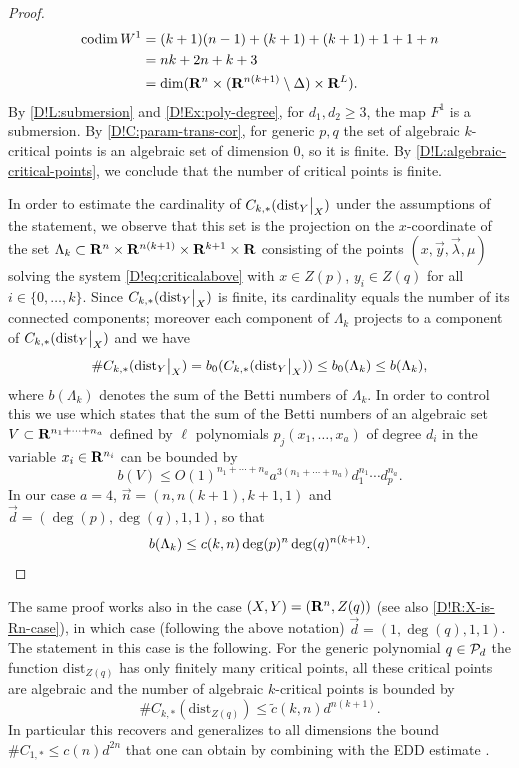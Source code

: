 \begin{proof}
  \begin{align*}
    \operatorname{codim} W^1 & = (k + 1) (n - 1) + (k + 1) + (k + 1) + 1 + 1 + n \\
    & = nk + 2n + k + 3 \\
    & = \dim(\mathbf{R}^n \times (\mathbf{R}^{n(k + 1)} \setminus \Delta) \times \mathbf{R}^L).
  \end{align*}
  By \cref{D!L:submersion} and \cref{D!Ex:poly-degree}, for $d_1, d_2 \geq 3$, the map $F^1$ is a submersion. By \cref{D!C:param-trans-cor}, for generic $p, q$ the set of algebraic $k$-critical points is an algebraic set of dimension $0$, so it is finite. By \cref{D!L:algebraic-critical-points}, we conclude that the number of critical points is finite.

  In order to estimate the cardinality of $C_{k, *}(\mathord{\operatorname{dist}}_Y\big|_X)$ under the assumptions of the statement, we observe that  this set is the projection on the $x$-coordinate of the set $\Lambda_k \subset \mathbf{R}^n\times \mathbf{R}^{n(k+1)}\times \mathbf{R}^{k+1}\times \mathbf{R}$ consisting of the points $(x, \vec{y}, \vec{\lambda}, \mu)$  solving the system \eqref{D!eq:criticalabove} with $x\in Z(p)$, $y_i\in Z(q)$ for all $i\in \{0, \ldots, k\}$. Since $C_{k, *}(\mathord{\operatorname{dist}}_Y\big|_X)$ is finite, its cardinality equals the number of its connected components; moreover each component of $\Lambda_k$ projects to a component of $C_{k, *}(\mathord{\operatorname{dist}}_Y\big|_X)$ and we have
  $$\#C_{k, *}(\mathord{\operatorname{dist}}_Y\big|_X)=b_0(C_{k, *}(\mathord{\operatorname{dist}}_Y\big|_X))\leq b_0(\Lambda_k)\leq b(\Lambda_k),$$
  where $b(\Lambda_k)$ denotes the sum of the Betti numbers of $\Lambda_k$. In order to control this we use \cite[Theorem 2.6]{basu2018multi} which states that the sum of the Betti numbers of an algebraic set $V\subset \mathbf{R}^{n_1+\cdots +n_a}$ defined by $\ell$ polynomials $p_j(x_1, \ldots, x_a)$ of degree $d_i$ in the variable $x_i\in\mathbf{R}^{n_i}$ can be bounded by
  $$b(V)\leq O(1)^{n_1+\cdots+n_a} a^{3(n_1+\cdots+n_a)}d_1^{n_1}\cdots d_p^{n_a}.$$
  In our case $a=4$, $\vec{n}=(n, n(k+1), k+1, 1)$ and $\vec{d}=(\deg(p), \deg(q), 1,1)$, so that
  \[
    b(\Lambda_k)\leq c(k,n)\deg(p)^n\deg(q)^{n(k+1)}.
    \qedhere
  \]
\end{proof}

\begin{remark}
\label{D!R:bottleneck-bounds}
  The same proof works also in the case $(X, Y)=(\mathbf{R}^n, Z(q))$ (see also \cref{D!R:X-is-Rn-case}), in which case (following the above notation)
  $\vec{d} = (1, \deg(q), 1,1)$. The statement in this case is the following. For the generic polynomial $q\in\mathcal{P}_d$ the function $\mathrm{dist}_{Z(q)}$ has only finitely many critical points, all these critical points are algebraic and the number of algebraic $k$-critical points is bounded by
  \[
    \#C_{k, *}(\mathrm{dist}_{Z(q)})\leq \widetilde{c}(k,n) d^{n(k+1)}.
  \]
  In particular this recovers and generalizes to all dimensions the bound $\#C_{1, *}\leq c(n)d^{2n}$ that one can obtain by combining \cite[Corollary 4.5]{Eklund2023} with the EDD estimate \cite[Corollary 2.10]{DHOST2016}.
\end{remark}

